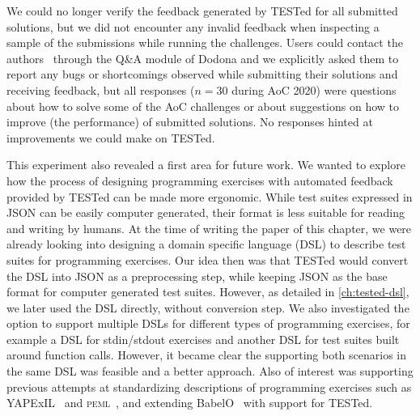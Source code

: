 \documentclass[../main]{subfiles}
\begin{document}
We could no longer verify the feedback generated by TESTed for all submitted solutions, but we did not encounter any invalid feedback when inspecting a sample of the submissions while running the challenges.
Users could contact the authors~\autocite{strijbolTESTedEducationalTesting2023} through the Q\&A module of Dodona and we explicitly asked them to report any bugs or shortcomings observed while submitting their solutions and receiving feedback, but all responses ($n=30$ during AoC 2020) were questions about how to solve some of the AoC challenges or about suggestions on how to improve (the performance) of submitted solutions.
No responses hinted at improvements we could make on TESTed.

This experiment also revealed a first area for future work.
We wanted to explore how the process of designing programming exercises with automated feedback provided by TESTed can be made more ergonomic.
While test suites expressed in JSON can be easily computer generated, their format is less suitable for reading and writing by humans.
At the time of writing the paper of this chapter, we were already looking into designing a domain specific language (DSL) to describe test suites for programming exercises.
Our idea then was that TESTed would convert the DSL into JSON as a preprocessing step, while keeping JSON as the base format for computer generated test suites.
However, as detailed in \cref{ch:tested-dsl}, we later used the DSL directly, without conversion step.
We also investigated the option to support multiple DSLs for different types of programming exercises, for example a DSL for stdin/stdout exercises and another DSL for test suites built around function calls.
However, it became clear the supporting both scenarios in the same DSL was feasible and a better approach.
Also of interest was supporting previous attempts at standardizing descriptions of programming exercises such as YAPExIL~\autocite{paivaAnotherProgrammingExercises2020} and \textsc{peml}~\autocite{cssplicepemlworkinggroupProgrammingExerciseMarkup2021}, and extending BabelO~\autocite{queirosBabeLOExtensibleConverter2013} with support for TESTed.
\end{document}
